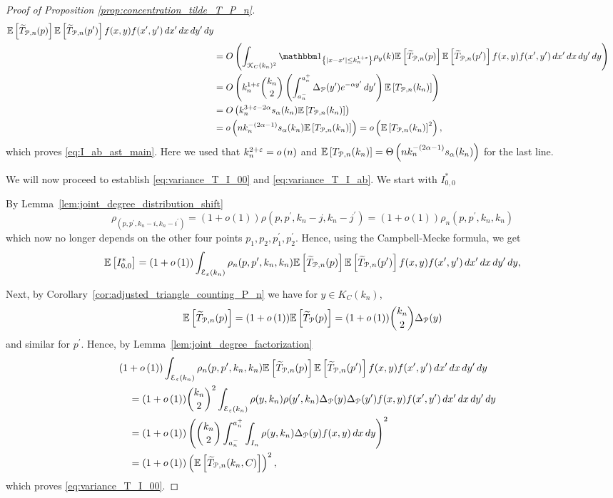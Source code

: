 \begin{proof}[Proof of Proposition \ref{prop:concentration_tilde_T_P_n}]
\begin{align*}
		\Exp{\widetilde{T}_{\Pcal,n}(p)}\Exp{\widetilde{T}_{\Pcal,n}(p^\prime)} f(x,y) f(x^\prime,y^\prime) \, dx^\prime \, dx \, dy^\prime \, dy\\
	&= \bigO{\int_{\Kcal_C(k_n)^2} \ind{|x-x^\prime| \le k_n^{1 + \varepsilon}} \rho_{y}(k) 
		\Exp{\widetilde{T}_{\Pcal,n}(p)}\Exp{\widetilde{T}_{\Pcal,n}(p^\prime)} f(x,y) f(x^\prime,y^\prime) \, dx^\prime \, dx \, dy^\prime \, dy}\\
	&= \bigO{k_n^{1+\varepsilon} \binom{k_n}{2} \left(\int_{a_n^-}^{a_n^+} \Delta_{\Pcal}(y^\prime) 
			e^{-\alpha y^\prime} \, dy^\prime\right) \Exp{T_{\Pcal,n}(k_n)}}\\
	&= \bigO{k_n^{3 + \varepsilon -2\alpha} s_\alpha(k_n) \Exp{T_{\Pcal,n}(k_n)}}\\
	&= \smallO{n k_n^{-(2\alpha - 1)}s_\alpha(k_n) \Exp{T_{\Pcal,n}(k_n)}} = \smallO{\Exp{T_{\Pcal,n}(k_n)}^2},
\end{align*}
which proves \eqref{eq:I_ab_ast_main}. Here we used that $k_n^{2 + \varepsilon} = o\left(n\right)$ and $\mathbb{E}\left[T_{{\mathcal P},n}(k_n)\right] = \Theta\left(n k_n^{-(2\alpha - 1)}s_\alpha(k_n)\right)$ for the last line.


We will now proceed to establish \eqref{eq:variance_T_I_00} and \eqref{eq:variance_T_I_ab}. We start with $I_{0,0}^\ast$ 


By Lemma~\ref{lem:joint_degree_distribution_shift} 
\[
	\rho_(p,p^\prime, k_n-i,k_n-i^\prime) = (1+o(1))\rho(p,p^\prime, k_n-j,k_n-j^\prime) 
	= (1+o(1))\rho_{n}(p, p^\prime, k_n, k_n)
\]
which now no longer depends on the other four points $p_1, p_2, p_1^\prime, p_2^\prime$. Hence, using the Campbell-Mecke formula, we get
\[
	\mathbb{E}\left[I_{0,0}^\ast\right] = (1 + o\left(1\right))\int_{\mathcal{E}_{\varepsilon}(k_n)}\rho_{n}(p,p^\prime,k_n, k_n)
		\mathbb{E}\left[\widetilde{T}_{{\mathcal P},n}(p)\right]\mathbb{E}\left[\widetilde{T}_{{\mathcal P},n}(p^\prime)\right] f(x,y)
		f(x^\prime,y^\prime) \, dx^\prime \, dx \, dy^\prime \, dy,
\]

Next, by Corollary~\ref{cor:adjusted_triangle_counting_P_n} we have for $y \in K_C(k_n)$,
\[
	\mathbb{E}\left[\widetilde{T}_{{\mathcal P},n}(p)\right] = (1+o\left(1\right))\mathbb{E}\left[\widetilde{T}_{{\mathcal P}}(p)\right] = (1 + o\left(1\right)) \binom{k_n}{2} \Delta_{{\mathcal P}}(y)
\] 
and similar for $p^\prime$. Hence, by Lemma~\ref{lem:joint_degree_factorization} 
\begin{align*}
	&\hspace{-10pt}(1 + \smallO{1})\int_{\mathcal{E}_\varepsilon(k_n)} \rho_n(p, p^\prime, k_n, k_n)
		\Exp{\widetilde{T}_{\Pcal,n}(p)}\Exp{\widetilde{T}_{\Pcal,n}(p^\prime)} f(x,y)
		f(x^\prime,y^\prime) \, dx^\prime \, dx \, dy^\prime \, dy\\
	&= (1+\smallO{1})\binom{k_n}{2}^2 \int_{\mathcal{E}_\varepsilon(k_n)} 
		\rho(y, k_n) \rho(y^\prime, k_n) \Delta_{\Pcal}(y) \Delta_\Pcal(y^\prime) 	f(x,y) 
		f(x^\prime,y^\prime) \, dx^\prime \, dx \, dy^\prime \, dy\\
	&= (1+\smallO{1}) \left( \binom{k_n}{2} \int_{a_n^-}^{a_n^+}\int_{I_n} \rho(y,k_n)
		\Delta_{\Pcal}(y) f(x,y) \, dx \, dy\right)^2\\
	&= (1 + \smallO{1})\left(\Exp{\widetilde{T}_{\Pcal,n}(k_n,C)}\right)^2,
\end{align*}
which proves \eqref{eq:variance_T_I_00}.


\end{proof}
